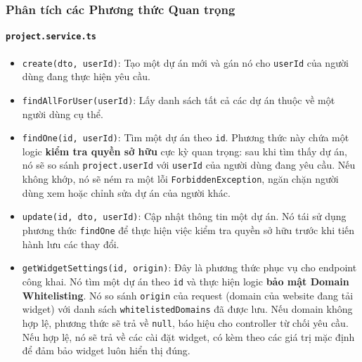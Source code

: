 \subsubsection{Phân tích các Phương thức Quan trọng}

\paragraph{\texttt{project.service.ts}}
\begin{itemize}
    \item \texttt{create(dto, userId)}: Tạo một dự án mới và gán nó cho \texttt{userId} của người dùng đang thực hiện yêu cầu.
    
    \item \texttt{findAllForUser(userId)}: Lấy danh sách tất cả các dự án thuộc về một người dùng cụ thể.
    
    \item \texttt{findOne(id, userId)}: Tìm một dự án theo \texttt{id}. Phương thức này chứa một logic \textbf{kiểm tra quyền sở hữu} cực kỳ quan trọng: sau khi tìm thấy dự án, nó sẽ so sánh \texttt{project.userId} với \texttt{userId} của người dùng đang yêu cầu. Nếu không khớp, nó sẽ ném ra một lỗi \texttt{ForbiddenException}, ngăn chặn người dùng xem hoặc chỉnh sửa dự án của người khác.
    
    \item \texttt{update(id, dto, userId)}: Cập nhật thông tin một dự án. Nó tái sử dụng phương thức \texttt{findOne} để thực hiện việc kiểm tra quyền sở hữu trước khi tiến hành lưu các thay đổi.
    
    \item \texttt{getWidgetSettings(id, origin)}: Đây là phương thức phục vụ cho endpoint công khai. Nó tìm một dự án theo \texttt{id} và thực hiện logic \textbf{bảo mật Domain Whitelisting}. Nó so sánh \texttt{origin} của request (domain của website đang tải widget) với danh sách \texttt{whitelistedDomains} đã được lưu. Nếu domain không hợp lệ, phương thức sẽ trả về \texttt{null}, báo hiệu cho controller từ chối yêu cầu. Nếu hợp lệ, nó sẽ trả về các cài đặt widget, có kèm theo các giá trị mặc định để đảm bảo widget luôn hiển thị đúng.
\end{itemize}

